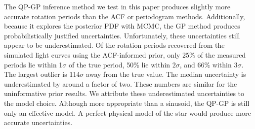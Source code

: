 \documentclass[a4paper,fleqn,usenatbib,useAMS]{mnras}
\newcommand{\tdmcomment}[1]{{\color{blue}#1}}
\begin{document}
The QP-GP inference method we test in this paper produces slightly more
accurate rotation periods than the ACF or periodogram methods.
Additionally, because it explores the posterior PDF with MCMC, the GP method
produces probabilistically justified uncertainties.
Unfortunately, these uncertainties still appear to be underestimated.
Of the rotation periods recovered from the simulated light curves using the
ACF-informed prior, only 25\% of the measured periods lie within 1$\sigma$ of
the true period, 50\% lie within 2$\sigma$, and 66\% within 3$\sigma$.
The largest outlier is 114$\sigma$ away from the true value.
The median uncertainty is underestimated by around a factor of two.
These numbers are similar for the uninformative prior results.
We attribute these underestimated uncertainties to the model choice.
Although more appropriate than a sinusoid, the QP-GP is still only an
 effective model.
A perfect physical model of the star would produce more accurate
uncertainties.
\end{document}

